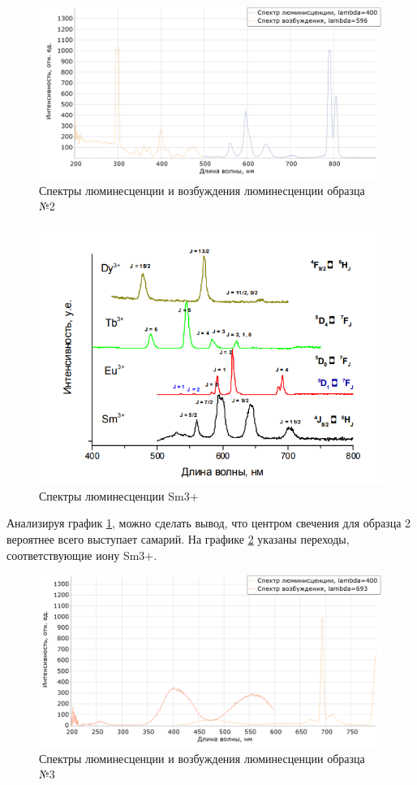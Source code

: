 \begin{figure}[H]
	\centering
	\includegraphics[width=7in]{figures/Obr_2}
	\caption{Спектры люминесценции и возбуждения люминесценции образца №2}
	\label{fig:Lum2}
\end{figure}

\begin{figure}[H]
	\centering
	\includegraphics[width=5in]{figures/img_1}
	\caption{Спектры люминесценции Sm3+\cite{BSpecCourse}}
	\label{fig:LumSum}
\end{figure}

Анализируя график \ref{fig:Lum2}, можно сделать вывод, что
центром свечения для образца 2 вероятнее всего выступает самарий.
На графике \ref{fig:LumSum} указаны переходы, соответствующие иону Sm3+.

\begin{figure}[H]
	\centering
	\includegraphics[width=7in]{figures/Obr_3}
	\caption{Спектры люминесценции и возбуждения люминесценции образца №3}
	\label{fig:Lum3}
\end{figure}

